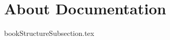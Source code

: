 \documentclass[class=book , crop=false]{standalone}
\begin{document}
	\section{About Documentation}

		{bookStructureSubsection.tex}
		
\end{document}
